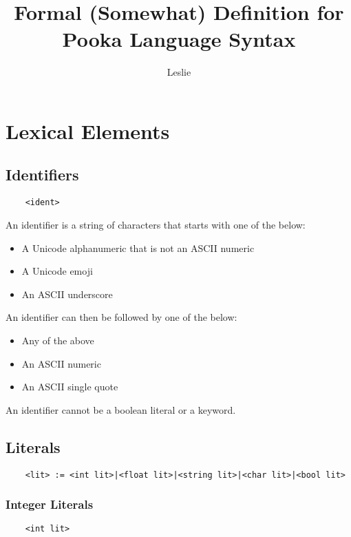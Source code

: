 \documentclass[a4paper]{article}
\title{Formal (Somewhat) Definition for Pooka Language Syntax}
\author{Leslie}
\begin{document}
\maketitle

\section{Lexical Elements}

\subsection{Identifiers}

\begin{verbatim}
    <ident>
\end{verbatim}

An identifier is a string of characters that starts with one of the below:

\begin{itemize}
    \item A Unicode alphanumeric that is not an ASCII numeric
    \item A Unicode emoji
    \item An ASCII underscore
\end{itemize}

An identifier can then be followed by one of the below:

\begin{itemize}
    \item Any of the above
    \item An ASCII numeric
    \item An ASCII single quote
\end{itemize}

An identifier cannot be a boolean literal or a keyword.

\subsection{Literals}

\begin{verbatim}
    <lit> := <int lit>|<float lit>|<string lit>|<char lit>|<bool lit>
\end{verbatim}

\subsubsection{Integer Literals}

\begin{verbatim}
    <int lit>
\end{verbatim}
\end{document}
